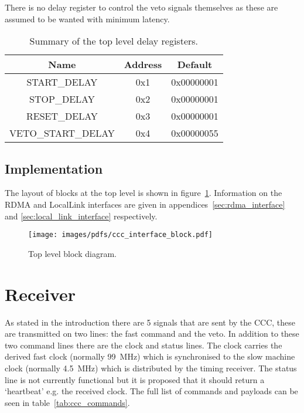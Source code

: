\documentclass[]{report}
\begin{document}
    There is no delay register to control the veto signals themselves as these are assumed to be wanted with minimum latency.
    
    \begin{table}
        \begin{center}
            \begin{tabular}{c | c | c }
                Name               & Address & Default    \\
                \hline
                START\_DELAY       & 0x1     & 0x00000001 \\
                STOP\_DELAY        & 0x2     & 0x00000001 \\
                RESET\_DELAY       & 0x3     & 0x00000001 \\
                VETO\_START\_DELAY & 0x4     & 0x00000055 \\
            \end{tabular}
        \end{center}
        \caption{Summary of the top level delay registers.}
        \label{tab:delay_regs}
    \end{table}
    \section{Implementation} %
    \label{sub:top_implementation}
    The layout of blocks at the top level is shown in figure~\ref{fig:ccc_interface_block}. Information on the RDMA and LocalLink interfaces are given in appendices~\ref{sec:rdma_interface} and \ref{sec:local_link_interface} respectively.
    
    \begin{figure}[htbp]
        \centering
            \texttt{[image: images/pdfs/ccc\_interface\_block.pdf]}
        \caption{Top level block diagram.}
        \label{fig:ccc_interface_block}
    \end{figure}
    
    \chapter{Receiver} %
    \label{sec:receiver}
    As stated in the introduction there are 5 signals that are sent by the CCC, these are transmitted on two lines: the fast command and the veto. In addition to these two command lines there are the clock and status lines. The clock carries the derived fast clock (normally 99~MHz) which is synchronised to the slow machine clock (normally 4.5~MHz) which is distributed by the timing receiver. The status line is not currently functional but it is proposed that it should return a `heartbeat' e.g. the received clock. The full list of commands and payloads can be seen in table~\ref{tab:ccc_commands}.
  
\end{document}
